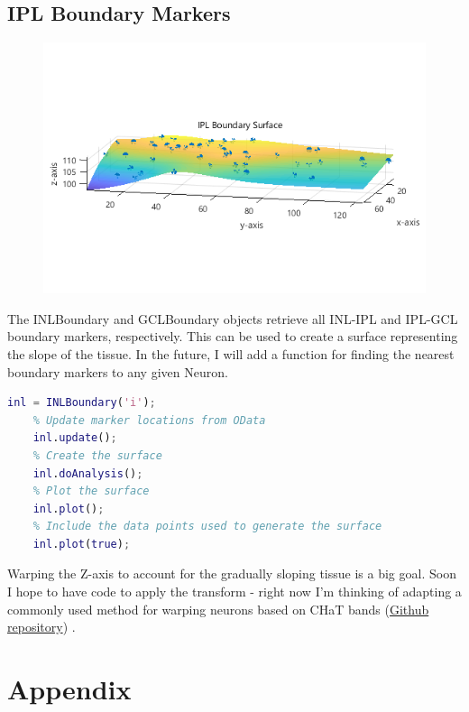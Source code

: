 \documentclass[12pt]{exam}
\begin{document}
	\subsection{IPL Boundary Markers}
	\begin{figure}
		\includegraphics[width=\linewidth]{iplboundary}
		\label{iplboundary}
	\end{figure}
	The INLBoundary and GCLBoundary objects retrieve all INL-IPL and IPL-GCL boundary markers, respectively. This can be used to create a surface representing the slope of the tissue. In the future, I will add a function for finding the nearest boundary markers to any given Neuron.
	\begin{lstlisting}[language=matlab]
	inl = INLBoundary('i');
	% Update marker locations from OData
	inl.update();
	% Create the surface
	inl.doAnalysis();
	% Plot the surface
	inl.plot();
	% Include the data points used to generate the surface
	inl.plot(true);\end{lstlisting}
	Warping the Z-axis to account for the gradually sloping tissue is a big goal. Soon I hope to have code to apply the transform - right now I'm thinking of adapting a commonly used method for warping neurons based on CHaT bands (\href{https://github.com/uygarsumbul/rgc}{Github repository}) \cite{Sumbul2014}.
	\section{Appendix}
\end{document}
